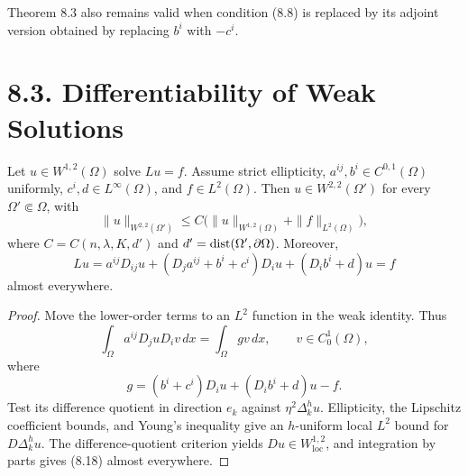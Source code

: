 \begin{remark}
\label{gt-rem-8-adjoint-sign-solvability}
Theorem 8.3 also remains valid when condition (8.8) is replaced by its adjoint
version obtained by replacing $b^i$ with $-c^i$.
\end{remark}

\section*{8.3. Differentiability of Weak Solutions}

\begin{theorem}
\label{gt-thm-8-8-interior-w22}
Let $u\in W^{1,2}(\Omega)$ solve $Lu=f$. Assume strict ellipticity,
$a^{ij},b^i\in C^{0,1}(\Omega)$ uniformly, $c^i,d\in L^\infty(\Omega)$, and
$f\in L^2(\Omega)$. Then $u\in W^{2,2}(\Omega')$ for every
$\Omega'\Subset\Omega$, with
\begin{equation}
\|u\|_{W^{2,2}(\Omega')}
\leq C\bigl(\|u\|_{W^{1,2}(\Omega)}+\|f\|_{L^2(\Omega)}\bigr),
\tag{8.17}
\end{equation}
where $C=C(n,\lambda,K,d')$ and $d'=\operatorname{dist}(\Omega',\partial\Omega)$.
Moreover,
\begin{equation}
Lu=a^{ij}D_{ij}u+(D_ja^{ij}+b^i+c^i)D_iu+(D_ib^i+d)u=f
\tag{8.18}
\end{equation}
almost everywhere.
\end{theorem}
\begin{proof}
\sketch Move the lower-order terms to an $L^2$ function in the weak identity.
Thus
\begin{equation}
\tag{8.19}
\int_\Omega a^{ij}D_j uD_i v\,dx=\int_\Omega gv\,dx,
\qquad v\in C_0^1(\Omega),
\end{equation}
where
\begin{equation}
\tag{8.20}
g=(b^i+c^i)D_i u+(D_i b^i+d)u-f.
\end{equation}
Test its difference quotient in direction $e_k$ against
$\eta^2\Delta_k^hu$. Ellipticity, the Lipschitz coefficient bounds, and Young's
inequality give an $h$-uniform local $L^2$ bound for $D\Delta_k^hu$.
The difference-quotient criterion yields $Du\in W^{1,2}_{\mathrm{loc}}$, and
integration by parts gives (8.18) almost everywhere.
\end{proof}

